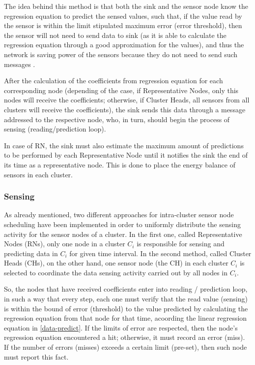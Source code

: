 \documentclass[conference]{IEEEtran}
\begin{document}
The idea behind this method is that both the sink and the sensor node know the
regression equation to predict the sensed values, such that, if the value read
by the sensor is within the limit stipulated maximum error (error threshold),
then the sensor will not need to send data to sink (as it is able to calculate
the regression equation through a good approximation for the values), and thus
the network is saving power of the sensors because they do not need to send such
messages \cite{MaiaACR2013}.

After the calculation of the coefficients from regression equation for each
corresponding node (depending of the case, if Representative Nodes, only this
nodes will receive the coefficients; otherwise, if Cluster Heads, all sensors
from all clusters will receive the coefficients), the sink sends this data
through a message addressed to the respective node, who, in turn, should begin
the process of sensing (reading/prediction loop).

In case of RN, the sink must also estimate the maximum amount of predictions to
be performed by each Representative Node until it notifies the sink the end of
its time as a representative node. This is done to place the energy balance of
sensors in each cluster.

 
\subsubsection{Sensing}

As already mentioned, two different approaches for intra-cluster sensor node
scheduling have been implemented in order to uniformly distribute the sensing
activity for the sensor nodes of a cluster. In the first one, called
Representative Nodes (RNs), only one node in a cluster $C_{i}$ is responsible
for sensing and predicting data in $C_{i}$ for given time interval. In the
second method, called Cluster Heads (CHs), on the other hand, one sensor node
(the CH) in each cluster $C_{i}$ is selected to coordinate the data sensing
activity carried out by all nodes in $C_{i}$.

So, the nodes that have received coefficients enter into reading / prediction
loop, in such a way that every step, each one must verify that the read value
(sensing) is within the bound of error (threshold) to the value
predicted by calculating the regression equation from that node for that time,
acoording the linear regression equation in \ref{data-predict}.
If the limits of error are respected, then the node's regression equation
encountered a hit; otherwise, it must record an error (miss). If the number of
errors (misses) exceeds a certain limit (pre-set), then such node must report
this fact.
\end{document}
